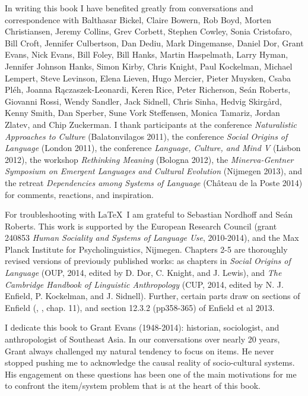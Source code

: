 
In writing this book I have benefited greatly from conversations 
and correspondence with Balthasar Bickel, Claire Bowern, Rob 
Boyd, Morten Christiansen, Jeremy Collins, Grev Corbett, Stephen Cowley, Sonia Cristofaro, Bill Croft, Jennifer Culbertson, Dan Dediu, Mark Dingemanse, Daniel Dor, Grant Evans\dag, Nick Evans, Bill Foley, Bill Hanks, Martin Haspelmath, Larry Hyman, Jennifer Johnson Hanks, Simon Kirby, Chris Knight, Paul Kockelman, Michael Lempert, Steve Levinson, Elena Lieven, Hugo Mercier, Pieter Muysken, Csaba Pl\'{e}h, Joanna R\k{a}cza\-szek-Leonardi, Keren Rice, Peter Richerson, Se\'{a}n Roberts, Giovanni Rossi, Wendy Sandler, Jack Sidnell, Chris Sinha, Hedvig Skirg\aa{}rd, Kenny Smith, Dan Sperber, Sune Vork Steffensen, Monica Tamariz, Jordan Zlatev, and Chip Zuckerman. I thank participants at the conference 
\textit{Naturalistic Approaches to Culture} (Balatonvilagos 2011), the 
conference \textit{Social Origins of Language} (London 2011), the 
conference \textit{Language, Culture, and Mind V} (Lisbon 2012), the workshop 
\textit{Rethinking Meaning} (Bologna 2012), the \textit{Minerva-Gentner Symposium on 
Emergent Languages and Cultural Evolution} (Nijmegen 2013), and the retreat \textit{Dependencies among Systems of Language} (Ch\^{a}teau de la Poste 2014) for comments, reactions, and inspiration. 

For troubleshooting with \LaTeX\ I am grateful to Sebastian Nordhoff and Se\'{a}n Roberts. This work is supported by the European Research Council 
(grant 240853 \textit{Human Sociality and Systems of Language Use}, 2010-2014), and 
the Max Planck Institute for Psycholinguistics, Nijmegen. Chapters 2-5 are thoroughly revised versions of previously published works: as chapters in 
\textit{Social Origins of Language} (OUP, 2014, edited by D. Dor, C. Knight, and J. Lewis), and \textit{The Cambridge Handbook of Linguistic Anthropology} 
(CUP, 2014, edited by N. J. Enfield, P. Kockelman, and J. Sidnell). Further, certain parts draw on sections of Enfield (\citeyear{enfield_transmission_2008}, \citeyear{enfield_relationship_2013}, 
chap. 11), and section 12.3.2 (pp358-365) of Enfield et al 2013. 

\enlargethispage{\baselineskip}
I dedicate this book to Grant Evans (1948-2014): historian, sociologist, and anthropologist of Southeast Asia. In our conversations over nearly 20 years, Grant always challenged my natural tendency to focus on items. He never stopped pushing me to acknowledge the causal reality of socio-cultural systems. His engagement on these questions has been one of the main motivations for me to confront the item/system problem that is at the heart of this book.
